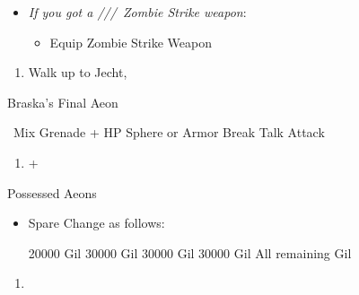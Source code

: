 \colstart
	\begin{equip}
		\begin{itemize}
			\item \textit{If you got a \lulu/\kimahri/\wakka/\rikku\ Zombie Strike weapon}:
				\begin{itemize}
					\item Equip Zombie Strike Weapon
				\end{itemize}
		\end{itemize}
	\end{equip}
	\begin{enumerate}[resume]
		\item Walk up to Jecht, \cs[4:30]
	\end{enumerate}
	\bothvfill\winvfill\lossvfill
	\begin{battle}[180000]{Braska's Final Aeon}
		\begin{itemize}
			\switch{\yuna}{\rikku}
			\rikkuf \od\ Mix Grenade + HP Sphere or Armor Break
			\tidusf Talk
			\switch{\auron}{\yuna}
			\summon{\bahamut}
			\bahamutf Attack
		\end{itemize}
	\end{battle}
\colend
\begin{enumerate}[resume]
	\item \cs+\skippablefmv[4:00]
\end{enumerate}
\begin{battle}{Possessed Aeons}
	\begin{itemize}
		\item Spare Change as follows:
			\begin{itemize}
				\valeforf \num{20000} Gil
				\ifritf \num{30000} Gil
				\ixionf \num{30000} Gil
				\shivaf \num{30000} Gil
				\bahamutf All remaining Gil
			\end{itemize}
	\end{itemize}
\end{battle}
\begin{enumerate}[resume]
	\item \cs[1:40]
\end{enumerate}
